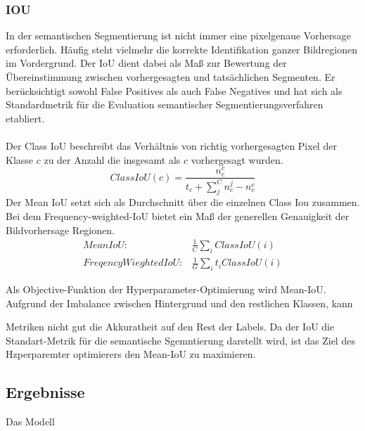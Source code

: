 \documentclass[12pt,DIV=15,BCOR=15mm,twoside,headsepline,abstract=true,listof=totoc,bibliography=totoc]{scrreprt}
\theoremstyle{remark}    %
\begin{document}
    \subsubsection{IOU}
    In der semantischen Segmentierung ist nicht immer eine pixelgenaue Vorhersage erforderlich. Häufig steht vielmehr die korrekte Identifikation ganzer 
    Bildregionen im Vordergrund. Der \ac{IoU} dient dabei als Maß zur Bewertung der Übereinstimmung zwischen vorhergesagten und tatsächlichen Segmenten. 
    Er berücksichtigt sowohl False Positives als auch False Negatives und hat sich als Standardmetrik für die Evaluation semantischer Segmentierungsverfahren 
    etabliert.\\\\ 
    Der Class \ac{IoU} beschreibt das Verhältnis von richtig vorhergesagten Pixel der Klasse $c$ zu der Anzahl die insgesamt als $c$ vorhergesagt wurden.
    \begin{equation}
        Class IoU(c) = \frac{n^c_{c}}{t_c + \sum_{j}^{C} n^j_{c} - n^c_{c}} 
    \end{equation}
    Der Mean \ac{IoU} setzt sich als Durchschnitt über die einzelnen Class Iou zusammen. Bei dem Frequency-weighted-\ac{IoU} bietet ein Maß der generellen Genauigkeit
    der Bildvorhersage Regionen.\cite{csurka2023semanticimagesegmentationdecades}
    \begin{align}
        Mean IoU:& \frac{1}{C} \sum_{i} Class IoU(i)\\
        Freqency Wieghted IoU: & \frac{1}{G} \sum_{i} t_i Class IoU(i)
    \end{align}\noindent

    Als Objective-Funktion der Hyperparameter-Optimierung wird Mean-\ac{IoU}. Aufgrund der Imbalance zwischen Hintergrund und den restlichen Klassen, kann 
    
    
    Metriken nicht gut die Akkuratheit auf den Rest der Labels. Da der \ac{IoU} die Standart-Metrik für die semantische Sgemntierung darstellt wird, ist das 
    Ziel des Hzperparemter optimierers den Mean-\ac{IoU} zu maximieren.
   
    \subsection{Ergebnisse}
    Das Modell
\end{document}
